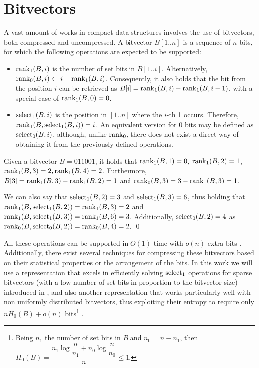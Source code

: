 \documentclass[a4paper,10pt,twoside]{book}
\begin{document}
	\section{Bitvectors}
	\label{sec:bit}
	A vast amount of works in compact data structures involves the use of bitvectors, both compressed and uncompressed. A bitvector $B[1..n]$ is a sequence of $n$ bits, for which the following operations are expected to be supported:

    \begin{itemize}
        \item $\operatorname{rank}_1(B,i)$ is the number of set bits in $B[1..i]$. Alternatively, $\operatorname{rank}_0(B,i)\leftarrow i - \operatorname{rank}_1(B,i)$. Consequently, it also holds that the bit from the position $i$ can be retrieved as $B[i] = \operatorname{rank}_1(B,i) - \operatorname{rank}_1(B,i-1)$, with a special case of $\operatorname{rank}_1(B,0) = 0$.
        \item $\operatorname{select}_1(B,i)$ is the position in $[1..n]$ where the $i$-th 1 occurs. Therefore, $\operatorname{rank}_1(B,\operatorname{select}_1(B,i)) = i$. An equivalent version for 0 bits may be defined as $\operatorname{select}_0(B,i)$, although, unlike $\operatorname{rank}_0$, there does not exist a direct way of obtaining it from the previously defined operations.
    \end{itemize}
    
    \begin{example}
        Given a bitvector $B = 011001$, it holds that $\operatorname{rank}_1(B,1) = 0$, $\operatorname{rank}_1(B,2) = 1$, $\operatorname{rank}_1(B,3) = 2, \operatorname{rank}_1(B,4) = 2$. Furthermore, $B[3] = \operatorname{rank}_1(B,3) - \operatorname{rank}_1(B,2) = 1$ and $\operatorname{rank}_0(B,3) = 3 - \operatorname{rank}_1(B,3) = 1$.
        
        We can also say that $\operatorname{select}_1(B,2) = 3$ and $\operatorname{select}_1(B,3) = 6$, thus holding that $\operatorname{rank}_1(B,\operatorname{select}_1(B,2)) = \operatorname{rank}_1(B,3) = 2$ and $\operatorname{rank}_1(B,\operatorname{select}_1(B,3)) = \operatorname{rank}_1(B,6) = 3$. Additionally, $\operatorname{select}_0(B,2) = 4$ as $\operatorname{rank}_0(B,\operatorname{select}_0(B,2)) = \operatorname{rank}_0(B,4) = 2$.
        \qed
    \end{example}
    
    All these operations can be supported in $O(1)$ time with $o(n)$ extra bits \cite{Jac89,Mun96}. 
    Additionally, there exist several techniques for compressing these bitvectors based on their statistical properties or the arrangement of the bits. In this work we will use a representation that excels in efficiently solving $\operatorname{select}_1$ operations for sparse bitvectors (with a low number of set bits in proportion to the bitvector size) introduced in \cite{okanohara2007practical}, and also another representation that works particularly well with non uniformly distributed bitvectors, thus exploiting their entropy to require only $nH_0(B) + o(n)$ bits\footnote{Being $n_1$ the number of set bits in $B$ and $n_0 = n - n_1$, then $H_0(B) = \dfrac{n_1\log\dfrac{n}{n_1} + n_0\log\dfrac{n}{n_0}}{n} \leq 1$.} \cite{Raman:2002:SID:545381.545411}.
	
\end{document}

